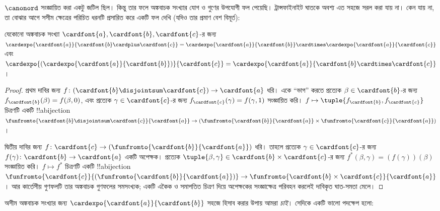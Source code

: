 \documentclass[../../../include/open-logic-section]{subfiles}
\begin{document}


$\canonord$ সংজ্ঞায়িত করা একটু জটিল ছিল। কিন্তু তার
ফলে অঙ্কবাচক সংখ্যার যোগ ও গুণের উপযোগী ফল
 পেয়েছি। ট্রান্সফাইনাইট
ঘাতকে অবশ্য এত সহজে সরল করা যায় না। কেন যায় না,
তা বোঝার আগে সসীম ক্ষেত্রের পরিচিত ধরনটি প্রসারিত
করে একটি ফল দেখি (যদিও তার প্রমাণ বেশ বিমূর্ত):

\begin{prop}
যেকোনো অঙ্কবাচক সংখ্যা $\cardfont{a},\cardfont{b},\cardfont{c}$-র জন্য
$\cardexpo{\cardfont{a}}{\cardfont{b}\cardplus\cardfont{c}}=
\cardexpo{\cardfont{a}}{\cardfont{b}}\cardtimes
\cardexpo{\cardfont{a}}{\cardfont{c}}$ এবং
$\cardexpo{(\cardexpo{\cardfont{a}}{\cardfont{b}})}{\cardfont{c}}=
\cardexpo{\cardfont{a}}{\cardfont{b}\cardtimes\cardfont{c}}$।
\end{prop}

\begin{proof}
প্রথম দাবির জন্য
$f\colon(\cardfont{b}\disjointsum\cardfont{c})\to\cardfont{a}$
ধরি। একে ``ভাগ'' করতে প্রত্যেক
$\beta\in\cardfont{b}$-র জন্য
$f_\cardfont{b}(\beta)=f(\beta,0)$, এবং প্রত্যেক
$\gamma\in\cardfont{c}$-র জন্য
$f_\cardfont{c}(\gamma)=f(\gamma,1)$
সংজ্ঞায়িত করি।
$f\mapsto\tuple{f_\cardfont{b},f_\cardfont{c}}$
চিত্রণটি একটি !!a{bijection}
$\funfromto{\cardfont{b}\disjointsum\cardfont{c}}{\cardfont{a}}
\to(\funfromto{\cardfont{b}}{\cardfont{a}}\times
\funfromto{\cardfont{c}}{\cardfont{a}})$।

দ্বিতীয় দাবির জন্য
$f\colon\cardfont{c}\to
(\funfromto{\cardfont{b}}{\cardfont{a}})$
ধরি। তাহলে প্রত্যেক $\gamma\in\cardfont{c}$-র জন্য
$f(\gamma)\colon\cardfont{b}\to\cardfont{a}$
একটি অপেক্ষক। প্রত্যেক
$\tuple{\beta,\gamma}\in\cardfont{b}\times\cardfont{c}$-র
জন্য $f^*(\beta,\gamma)=(f(\gamma))(\beta)$
সংজ্ঞায়িত করি।
$f\mapsto f^*$ চিত্রণটি একটি !!a{bijection}
$\funfromto{\cardfont{c}}{(\funfromto{\cardfont{b}}{\cardfont{a}})}
\to\funfromto{\cardfont{b}\times\cardfont{c}}{\cardfont{a}}$।
আর কার্তেসীয় গুণফলটি তার অঙ্কবাচক গুণফলের
সমসংখ্যক;
একটি একৈক ও সমাপতিত চিত্রণ দিয়ে অপেক্ষকের
সংজ্ঞাক্ষেত্র পরিবহন করলেই দাবিকৃত ঘাত-সমতা মেলে।
\end{proof}

অসীম অঙ্কবাচক সংখ্যার জন্য
$\cardexpo{\cardfont{a}}{\cardfont{b}}$
সহজে হিসাব করার উপায় আমরা \emph{চাই}।
সেদিকে একটি ভালো পদক্ষেপ হলো:
\end{document}
